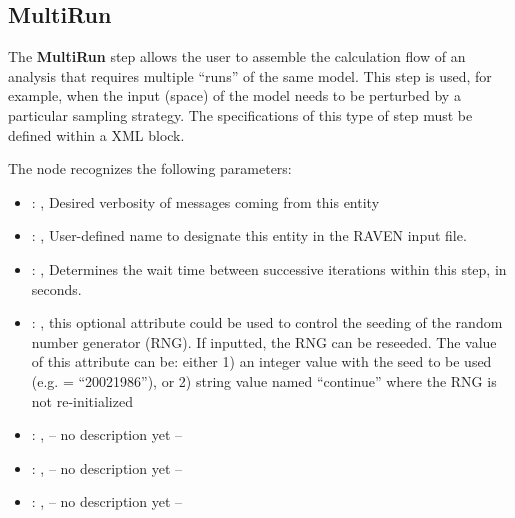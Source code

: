 

\subsection{MultiRun}
   The \textbf{MultiRun} step allows the user to assemble the calculation flow of an analysis that
  requires multiple ``runs'' of the same model. This step is used, for example, when the input
  (space) of the model needs to be perturbed by a particular sampling strategy. The specifications
  of this type of step must be defined within a  XML block.

  The  node recognizes the following parameters:
    \begin{itemize}
      \item {}: , 
        Desired verbosity of messages coming from this entity
      \item {}: , 
        User-defined name to designate this entity in the RAVEN input file.
      \item {}: , 
        Determines the wait time between successive iterations within this step, in seconds.
      \item {}: , 
         this optional attribute could be used to control the seeding of the random number generator
        (RNG). If inputted, the RNG can be reseeded. The value of this attribute can be: either 1)
        an integer value with the seed to be used (e.g.  = ``20021986''), or 2)
        string value named ``continue'' where the RNG is not re-initialized
      \item {}: , 
        -- no description yet --
      \item {}: , 
        -- no description yet --
      \item {}: , 
        -- no description yet --
  \end{itemize}

